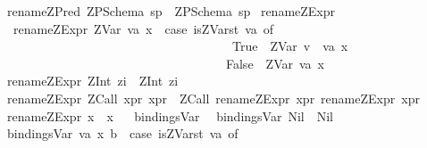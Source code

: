 \begin{isabellebody}
{\isacharbar}\ {\isachardoublequoteopen}rename{\isacharunderscore}ZPred\ {\isacharparenleft}ZPSchema\ sp{\isacharparenright}\ {\isacharequal}\ {\isacharparenleft}ZPSchema\ sp{\isacharparenright}{\isachardoublequoteclose}\isanewline
\isanewline
{}\isamarkupfalse%
\ rename{\isacharunderscore}ZExpr\isanewline
{}\isanewline
\ \ {\isachardoublequoteopen}rename{\isacharunderscore}ZExpr\ {\isacharparenleft}ZVar\ {\isacharparenleft}va{\isacharcomma}\ x{\isacharparenright}{\isacharparenright}\ {\isacharequal}\ {\isacharparenleft}case\ {\isacharparenleft}is{\isacharunderscore}ZVar{\isacharunderscore}st\ va{\isacharparenright}\ of\isanewline
\ \ \ \ \ \ \ \ \ \ \ \ \ \ \ \ \ \ \ \ \ \ \ \ \ \ \ \ \ \ \ \ \ \ \ \ \ True\ {\isasymRightarrow}\ {\isacharparenleft}ZVar\ {\isacharparenleft}{\isacharprime}{\isacharprime}v{\isacharunderscore}{\isacharprime}{\isacharprime}\ {\isacharat}\ va{\isacharcomma}\ x{\isacharparenright}{\isacharparenright}\isanewline
\ \ \ \ \ \ \ \ \ \ \ \ \ \ \ \ \ \ \ \ \ \ \ \ \ \ \ \ \ \ \ \ \ \ \ {\isacharbar}\ False\ {\isasymRightarrow}\ {\isacharparenleft}ZVar\ {\isacharparenleft}va{\isacharcomma}\ x{\isacharparenright}{\isacharparenright}{\isacharparenright}{\isachardoublequoteclose}\isanewline
{\isacharbar}\ {\isachardoublequoteopen}rename{\isacharunderscore}ZExpr\ {\isacharparenleft}ZInt\ zi{\isacharparenright}\ {\isacharequal}\ {\isacharparenleft}ZInt\ zi{\isacharparenright}{\isachardoublequoteclose}\isanewline
{\isacharbar}\ {\isachardoublequoteopen}rename{\isacharunderscore}ZExpr\ {\isacharparenleft}ZCall\ xpr{}\ xpr{}{\isacharparenright}\ {\isacharequal}\ {\isacharparenleft}ZCall\ {\isacharparenleft}rename{\isacharunderscore}ZExpr\ xpr{}{\isacharparenright}\ {\isacharparenleft}rename{\isacharunderscore}ZExpr\ xpr{}{\isacharparenright}{\isacharparenright}{\isachardoublequoteclose}\isanewline
{\isacharbar}\ {\isachardoublequoteopen}rename{\isacharunderscore}ZExpr\ x\ {\isacharequal}\ x{\isachardoublequoteclose}\isanewline
\isanewline
\ \isanewline
{}\isamarkupfalse%
\ bindingsVar\isanewline
{}\isanewline
\ \ {\isachardoublequoteopen}bindingsVar\ Nil\ {\isacharequal}\ Nil{\isachardoublequoteclose}\isanewline
{\isacharbar}\ {\isachardoublequoteopen}bindingsVar\ {\isacharbrackleft}{\isacharparenleft}{\isacharparenleft}va{\isacharcomma}\ x{\isacharparenright}{\isacharcomma}\ b{\isacharparenright}{\isacharbrackright}\ {\isacharequal}\ {\isacharparenleft}case\ {\isacharparenleft}is{\isacharunderscore}ZVar{\isacharunderscore}st\ va{\isacharparenright}\ of\isanewline

\end{isabellebody}
